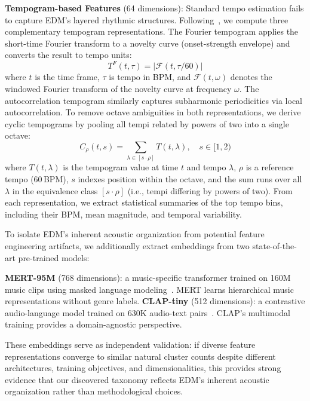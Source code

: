 \documentclass{article}
\begin{document}
	\textbf{Tempogram-based Features} (64 dimensions): Standard tempo estimation fails to capture EDM's layered rhythmic structures. Following~\cite{grosche2012}, we compute three complementary tempogram representations. The Fourier tempogram applies the short-time Fourier transform to a novelty curve (onset-strength envelope) and converts the result to tempo units:
	\begin{equation}
		T^F(t,\tau) = |\mathcal{F}(t,\tau/60)|
	\end{equation}
	where $t$ is the time frame, $\tau$ is tempo in BPM, and $\mathcal{F}(t,\omega)$ denotes the windowed Fourier transform of the novelty curve at frequency $\omega$. The autocorrelation tempogram similarly captures subharmonic periodicities via local autocorrelation. To remove octave ambiguities in both representations, we derive cyclic tempograms by pooling all tempi related by powers of two into a single octave:
	\begin{equation}
		C_\rho(t,s) = \sum_{\lambda \in [s\cdot\rho]} T(t,\lambda), \quad s \in [1,2)
	\end{equation}
	where $T(t,\lambda)$ is the tempogram value at time $t$ and tempo $\lambda$, $\rho$ is a reference tempo (60\,BPM), $s$ indexes position within the octave, and the sum runs over all $\lambda$ in the equivalence class $[s\cdot\rho]$ (i.e., tempi differing by powers of two). From each representation, we extract statistical summaries of the top tempo bins, including their BPM, mean magnitude, and temporal variability.

	To isolate EDM's inherent acoustic organization from potential feature engineering artifacts, we additionally extract embeddings from two state-of-the-art pre-trained models:

	\textbf{MERT-95M} (768 dimensions): a music-specific transformer trained on 160M music clips using masked language modeling~\cite{li2024mert}. MERT learns hierarchical music representations without genre labels. \textbf{CLAP-tiny} (512 dimensions): a contrastive audio-language model trained on 630K audio-text pairs~\cite{wu2023clap}. CLAP's multimodal training provides a domain-agnostic perspective.

	These embeddings serve as independent validation: if diverse feature representations converge to similar natural cluster counts despite different architectures, training objectives, and dimensionalities, this provides strong evidence that our discovered taxonomy reflects EDM's inherent acoustic organization rather than methodological choices.
\end{document}
